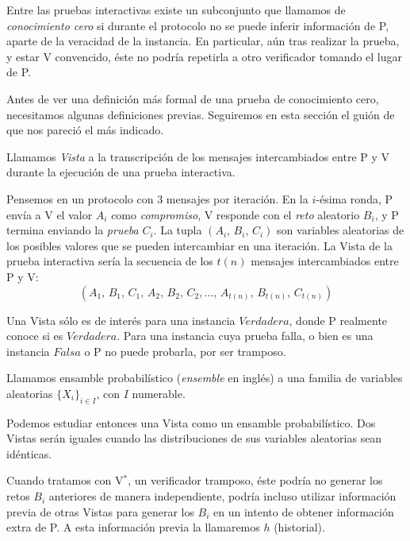 Entre las pruebas interactivas existe un subconjunto que llamamos de \textit{conocimiento cero} si durante el protocolo no se puede inferir información de P, aparte de la veracidad de la instancia. En particular, aún tras realizar la prueba, y estar V convencido, éste no podría repetirla a otro verificador tomando el lugar de P.

\hfil

Antes de ver una definición más formal de una prueba de conocimiento cero, necesitamos algunas definiciones previas. Seguiremos en esta sección el guión de \citep{pieprzyk2013fundamentals} que nos pareció el más indicado.



\begin{definition}
	Llamamos \textit{Vista} a la transcripción de los mensajes intercambiados entre P y V durante la ejecución de una prueba interactiva.
\end{definition}


Pensemos en un protocolo con 3 mensajes por iteración. En la $i$-ésima ronda, P envía a V el valor $A_i$ como \textit{compromiso}, V responde con el \textit{reto} aleatorio $B_i$, y P termina enviando la \textit{prueba} $C_i$. La tupla $(A_i,\,B_i,\,C_i)$ son variables aleatorias de los posibles valores que se pueden intercambiar en una iteración. La Vista de la prueba interactiva sería la secuencia de los $t(n)$ mensajes intercambiados entre P y V:
\[(A_1,\,B_1,\,C_1,\,A_2,\,B_2,\,C_2,\dots ,\,A_{t(n)},\,B_{t(n)},\,C_{t(n)})\]


Una Vista sólo es de interés para una instancia $Verdadera$, donde P realmente conoce si es $Verdadera$. Para una instancia cuya prueba falla, o bien es una instancia $Falsa$ o P no puede probarla, por ser tramposo.


\begin{definition}
	Llamamos ensamble probabilístico (\textit{ensemble} en inglés) a una familia de variables aleatorias $\{X_i\}_{i\in I}$, con $I$ numerable.
\end{definition}

Podemos estudiar entonces una Vista como un ensamble probabilístico. Dos Vistas serán iguales cuando las distribuciones de sus variables aleatorias sean idénticas.


\hfil

Cuando tratamos con V$^*$, un verificador tramposo, éste podría no generar los retos $B_i$ anteriores de manera independiente, podría incluso utilizar información previa de otras Vistas para generar los $B_i$ en un intento de obtener información extra de P. A esta información previa la llamaremos $h$ (historial).


